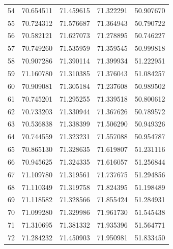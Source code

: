 \begin{table}
\begin{tabular}{rrrrr}
54 & 70.654511 & 71.459615 & 71.322291 & 50.907670 \\
55 & 70.724312 & 71.576687 & 71.364943 & 50.790722 \\
56 & 70.582121 & 71.627073 & 71.278895 & 50.746227 \\
57 & 70.749260 & 71.535959 & 71.359545 & 50.999818 \\
58 & 70.907286 & 71.390114 & 71.399934 & 51.222951 \\
59 & 71.160780 & 71.310385 & 71.376043 & 51.084257 \\
60 & 70.909081 & 71.305184 & 71.237608 & 50.989502 \\
61 & 70.745201 & 71.295255 & 71.339518 & 50.800612 \\
62 & 70.733203 & 71.330944 & 71.367626 & 50.789572 \\
63 & 70.536838 & 71.338399 & 71.506290 & 50.949326 \\
64 & 70.744559 & 71.323231 & 71.557088 & 50.954787 \\
65 & 70.865130 & 71.328635 & 71.619807 & 51.231116 \\
66 & 70.945625 & 71.324335 & 71.616057 & 51.256844 \\
67 & 71.109780 & 71.319561 & 71.737675 & 51.294856 \\
68 & 71.110349 & 71.319758 & 71.824395 & 51.198489 \\
69 & 71.118582 & 71.328566 & 71.855424 & 51.284931 \\
70 & 71.099280 & 71.329986 & 71.961730 & 51.545438 \\
71 & 71.310695 & 71.381332 & 71.935396 & 51.564771 \\
72 & 71.284232 & 71.450903 & 71.950981 & 51.833450 \\
\bottomrule
\end{tabular}
\end{table}
